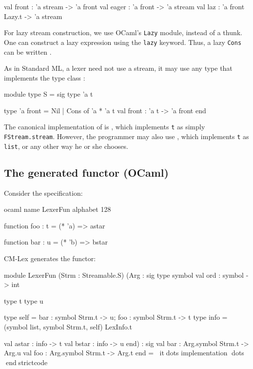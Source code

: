 \documentclass[10pt]{article}
\begin{document}
\begin{strictcode}
\begin{code}
val front : 'a stream -> 'a front
val eager : 'a front -> 'a stream
val laz : 'a front Lazy.t -> 'a stream
\end{code}

For lazy stream construction, we use OCaml's {\tt Lazy} module,
instead of a thunk.  One can construct a lazy expression using the
{\tt lazy} keyword.  Thus, a lazy {\tt Cons} can be written .

As in Standard ML, a lexer need not use a stream, it may use any type
that implements the type class :

\begin{code}
module type S =
   sig
      type 'a t

      type 'a front = Nil | Cons of 'a * 'a t
      val front : 'a t -> 'a front
   end
\end{code}

The canonical implementation of  is
, which implements {\tt t} as simply
{\tt FStream.stream}.  However, the programmer may also use
, which implements {\tt t} as {\tt
list}, or any other way he or she chooses.



\subsection{The generated functor (OCaml)}

Consider the specification:

\begin{code}
ocaml
name LexerFun
alphabet 128

function foo : t =
  (* 'a) => astar

function bar : u =
  (* 'b) => bstar
\end{code}

CM-Lex generates the functor:

\begin{strictcode}
module LexerFun
   (Strm : Streamable.S)
   (Arg :
       sig
          type symbol
          val ord : symbol -> int

          type t
          type u

          type self = { bar : symbol Strm.t -> u;
                        foo : symbol Strm.t -> t }
          type info = (symbol list, symbol Strm.t, self) LexInfo.t

          val astar : info -> t
          val bstar : info -> u
       end)
   :
   sig
      val bar : Arg.symbol Strm.t -> Arg.u
      val foo : Arg.symbol Strm.t -> Arg.t
   end
= itdots implementation dots
endstrictcode


\end{strictcode}
\end{strictcode}
\end{document}
